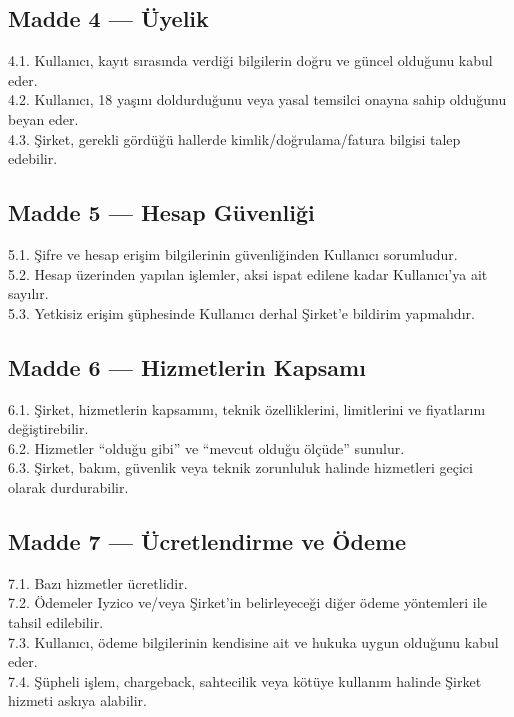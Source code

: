 \documentclass[12pt,a4paper]{article}
\begin{document}
\subsection*{Madde 4 --- \"{U}yelik}
4.1. Kullan{\i}c{\i}, kay{\i}t s{\i}ras{\i}nda verdi\u{g}i bilgilerin do\u{g}ru ve g\"{u}ncel oldu\u{g}unu kabul eder.\\
4.2. Kullan{\i}c{\i}, 18 ya\c{s}{\i}n{\i} doldurdu\u{g}unu veya yasal temsilci onayna sahip oldu\u{g}unu beyan eder.\\
4.3. \c{S}irket, gerekli g\"{o}rd\"{u}\u{g}\"{u} hallerde kimlik/do\u{g}rulama/fatura bilgisi talep edebilir.

\subsection*{Madde 5 --- Hesap G\"{u}venli\u{g}i}
5.1. \c{S}ifre ve hesap eri\c{s}im bilgilerinin g\"{u}venli\u{g}inden Kullan{\i}c{\i} sorumludur.\\
5.2. Hesap \"{u}zerinden yap{\i}lan i\c{s}lemler, aksi ispat edilene kadar Kullan{\i}c{\i}'ya ait say{\i}l{\i}r.\\
5.3. Yetkisiz eri\c{s}im \c{s}\"{u}phesinde Kullan{\i}c{\i} derhal \c{S}irket'e bildirim yapmal{\i}d{\i}r.

\subsection*{Madde 6 --- Hizmetlerin Kapsam{\i}}
6.1. \c{S}irket, hizmetlerin kapsam{\i}n{\i}, teknik \"{o}zelliklerini, limitlerini ve fiyatlar{\i}n{\i} de\u{g}i\c{s}tirebilir.\\
6.2. Hizmetler ``oldu\u{g}u gibi'' ve ``mevcut oldu\u{g}u \"{o}l\c{c}\"{u}de'' sunulur.\\
6.3. \c{S}irket, bak{\i}m, g\"{u}venlik veya teknik zorunluluk halinde hizmetleri ge\c{c}ici olarak durdurabilir.

\subsection*{Madde 7 --- \"{U}cretlendirme ve \"{O}deme}
7.1. Baz{\i} hizmetler \"{u}cretlidir.\\
7.2. \"{O}demeler Iyzico ve/veya \c{S}irket'in belirleyece\u{g}i di\u{g}er \"{o}deme y\"{o}ntemleri ile tahsil edilebilir.\\
7.3. Kullan{\i}c{\i}, \"{o}deme bilgilerinin kendisine ait ve hukuka uygun oldu\u{g}unu kabul eder.\\
7.4. \c{S}\"{u}pheli i\c{s}lem, chargeback, sahtecilik veya k\"{o}t\"{u}ye kullan{\i}m halinde \c{S}irket hizmeti
askıya alabilir.
\end{document}
